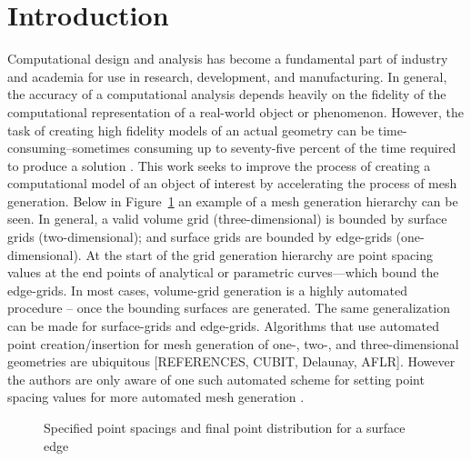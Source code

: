\section{Introduction}Computational design and analysis has become a 
fundamental part of industry and academia for use in research, 
development, and manufacturing. In general, the accuracy of a 
computational analysis depends heavily on the fidelity of the 
computational representation of a real-world object or phenomenon. 
However, the task of creating high fidelity models of an actual geometry 
can be time-consuming--sometimes consuming up to seventy-five percent of 
the time required to produce a solution \cite{bischoff05}. This work seeks to improve the process of creating a computational model of an object of interest by accelerating the process of mesh generation. Below in Figure~\ref{GridGenerationProcess} an example of a mesh generation hierarchy can be seen. In general, a valid volume grid (three-dimensional) is bounded by surface grids (two-dimensional); and surface grids are bounded by edge-grids (one-dimensional). At the start of the grid generation hierarchy are point spacing values at the end points of analytical or parametric curves—which bound the edge-grids. In most cases, volume-grid generation is a highly automated procedure -- once the bounding surfaces are generated. The same generalization can be made for surface-grids and edge-grids. Algorithms that use automated point creation/insertion for mesh generation of one-, two-, and three-dimensional geometries are ubiquitous [REFERENCES, CUBIT, Delaunay, AFLR]. However the authors are only aware of one such automated scheme for setting point spacing values for more automated mesh generation \cite{mclaurin12}.\\

\begin{figure}[h!]
 \caption{\label{GridGenerationProcess} Specified point spacings and final point distribution for a surface edge \cite{thompson98}}
\end{figure}

